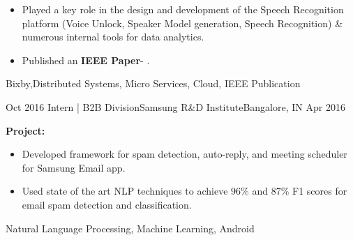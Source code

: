 \begin{experiences}
{\begin{itemize}
                        \item Played a key role in the design and development of the Speech Recognition platform (Voice Unlock, Speaker Model generation, Speech Recognition) \& numerous internal tools for data analytics.
                       
                        \item Published an \textbf{IEEE Paper}- \href{https://ieeexplore.ieee.org/document/8628899}{\color{accentcolor}{Adaptive Speech Recognition Using Keyboard Data}}.
                       
                      \end{itemize}
                    }
                    {Bixby,Distributed Systems, Micro Services, Cloud, IEEE Publication}
  \emptySeparator
  
  
 
  
  \experience
    {Oct 2016}     {Intern | B2B Division}{Samsung R\&D Institute}{Bangalore, IN}
    {Apr 2016}    {
                    \textbf{Project: \color{accentcolor}{Smart Engine for Samsung Email app}}
                      \begin{itemize}
                        \item Developed framework for spam detection, auto-reply, and meeting scheduler for Samsung Email app.
                        \item Used state of the art NLP techniques to achieve $96\%$ and $87\%$ F1 scores for email spam detection and classification.
                      \end{itemize}
                    }
                    {Natural Language Processing, Machine Learning, Android}
 \emptySeparator
 
  


\end{experiences}
